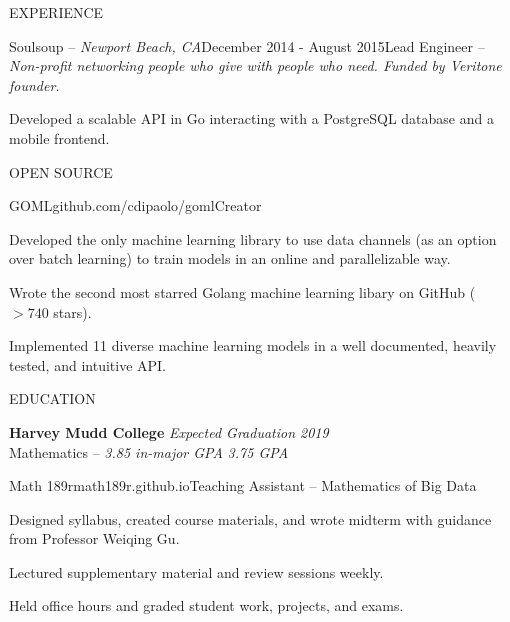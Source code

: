 \documentclass{resume} %
\begin{document}
\begin{rSection}{EXPERIENCE}
\begin{rSubsection}{Soulsoup -- {\it Newport Beach, CA}}{December 2014 - August 2015}{Lead Engineer -- {\sl Non-profit networking people who give with people who need. Funded by Veritone founder.}}

\item Developed a scalable API in Go interacting with a PostgreSQL database and a
    mobile frontend.
\end{rSubsection} 

\end{rSection}


\begin{rSection}{OPEN SOURCE}

\begin{rSubsection}{GOML}{\textsf{github.com/cdipaolo/goml}}{Creator}

\item Developed the only machine learning library to use data channels (as an option over batch learning) to train models in an online and parallelizable way.
\item Wrote the second most starred Golang machine learning libary on GitHub ($>740$ stars).
\item Implemented 11 diverse machine learning models in a well documented, heavily tested, and intuitive API.
\end{rSubsection}

\end{rSection}



\begin{rSection}{EDUCATION}

{\bf Harvey Mudd College} \hfill {\em Expected Graduation 2019} \\ 
Mathematics -- {\em 3.85 in-major GPA} \hfill {\em 3.75 GPA}

\begin{rSubsection}{Math 189r}{\textsf{math189r.github.io}}{Teaching Assistant -- Mathematics of Big Data}

\item Designed syllabus, created course materials, and wrote midterm with guidance from Professor Weiqing Gu.
\item Lectured supplementary material and review sessions weekly.
\item Held office hours and graded student work, projects, and exams.
\end{rSubsection}
\end{rSection}
\end{document}
